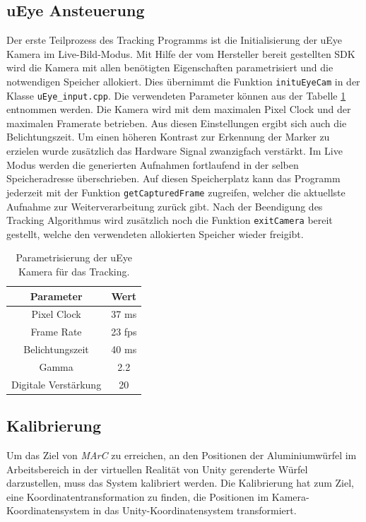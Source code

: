 \subsection{uEye Ansteuerung}
Der erste Teilprozess des Tracking Programms ist die Initialisierung der uEye Kamera im Live-Bild-Modus. Mit Hilfe der vom Hersteller bereit gestellten SDK wird die Kamera mit allen benötigten Eigenschaften parametrisiert und die notwendigen Speicher allokiert. Dies übernimmt die Funktion \texttt{inituEyeCam} in der Klasse \texttt{uEye\_input.cpp}. Die verwendeten Parameter können aus der Tabelle \ref{tab:UeyeParam} entnommen werden. Die Kamera wird mit dem maximalen Pixel Clock und der maximalen Framerate betrieben. Aus diesen Einstellungen ergibt sich auch die Belichtungszeit. Um einen höheren Kontrast zur Erkennung der Marker zu erzielen wurde zusätzlich das Hardware Signal zwanzigfach verstärkt.
Im Live Modus werden die generierten Aufnahmen fortlaufend in der selben Speicheradresse überschrieben. Auf diesen Speicherplatz kann das Programm jederzeit mit der Funktion \texttt{getCapturedFrame} zugreifen, welcher die aktuellste Aufnahme zur Weiterverarbeitung zurück gibt. Nach der Beendigung des Tracking Algorithmus wird zusätzlich noch die Funktion \texttt{exitCamera} bereit gestellt, welche den verwendeten allokierten Speicher wieder freigibt.
\begin{table}
	\centering
	\begin{tabular}{|c|c|}
		\hline
		\Absatzbox{}
		\textbf{Parameter}& \textbf{Wert} \\
		\hline
		Pixel Clock & 37 ms \\
		\hline
		Frame Rate & 23 fps \\
		\hline 
		Belichtungszeit & 40 ms\\
		\hline
		Gamma & 2.2 \\
		\hline
		Digitale Verstärkung & 20 \\
		\hline
	\end{tabular}
	\caption{Parametrisierung der uEye Kamera für das Tracking.}
	\label{tab:UeyeParam}
\end{table}

\subsection{Kalibrierung}\label{sec:calib}
Um das Ziel von \textit{MArC} zu erreichen, an den Positionen der Aluminiumwürfel im Arbeitsbereich in der virtuellen Realität von Unity gerenderte Würfel darzustellen, muss das System kalibriert werden. Die Kalibrierung hat zum Ziel, eine Koordinatentransformation zu finden, die Positionen im Kamera-Koordinatensystem in das Unity-Koordinatensystem transformiert.

